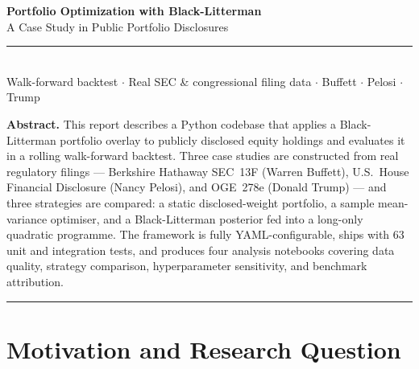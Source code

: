 \documentclass[11pt, a4paper]{article}
\begin{document}

\begin{center}
  {\LARGE\bfseries\color{blnavy}
    Portfolio Optimization with Black-Litterman}\\[8pt]
  {\large A Case Study in Public Portfolio Disclosures}\\[10pt]
  \textcolor{blnavy!50}{\rule{0.6\linewidth}{0.5pt}}\\[6pt]
  \small\textcolor{blnavy!70}{
    Walk-forward backtest $\cdot$ Real SEC \& congressional filing data
    $\cdot$ Buffett $\cdot$ Pelosi $\cdot$ Trump}
\end{center}

\vspace{8pt}

\begin{tcolorbox}[colback=blgrey, colframe=blnavy!20, arc=3pt,
                  boxrule=0.4pt, left=10pt, right=10pt,
                  top=8pt, bottom=8pt]
  \small\textbf{Abstract.}\;
  This report describes a Python codebase that applies a Black-Litterman
  portfolio overlay to publicly disclosed equity holdings and evaluates it
  in a rolling walk-forward backtest. Three case studies are constructed from
  real regulatory filings --- Berkshire Hathaway SEC~13F (Warren Buffett),
  U.S.\ House Financial Disclosure (Nancy Pelosi), and OGE~278e
  (Donald Trump) --- and three strategies are compared: a static
  disclosed-weight portfolio, a sample mean-variance optimiser, and a
  Black-Litterman posterior fed into a long-only quadratic programme.
  The framework is fully YAML-configurable, ships with 63 unit and
  integration tests, and produces four analysis notebooks covering data
  quality, strategy comparison, hyperparameter sensitivity, and benchmark
  attribution.
\end{tcolorbox}

\tableofcontents
\vspace{6pt}
\textcolor{blnavy!20}{\rule{\linewidth}{0.4pt}}

\section{Motivation and Research Question}
\end{document}
